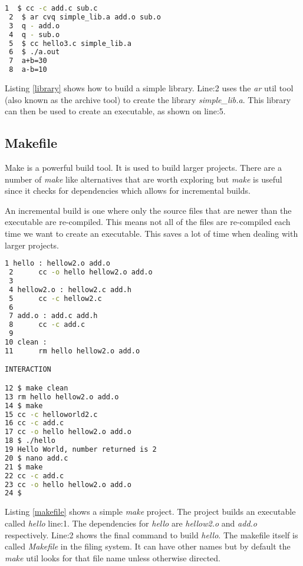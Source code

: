 \begin{lstlisting}[language=bash,showstringspaces=false,caption={File hellow3.c, build library},captionpos=b,label=library]
 1  $ cc -c add.c sub.c
 2  $ ar cvq simple_lib.a add.o sub.o
 3  q - add.o
 4  q - sub.o
 5  $ cc hello3.c simple_lib.a
 6  $ ./a.out
 7  a+b=30
 8  a-b=10 	
\end{lstlisting}

Listing \ref{library} shows how to build a simple library. Line:2 uses the \textit{ar} util tool (also known as the archive tool) to create the library \textit{simple\_lib.a}. This library can then be used to create an executable, as shown on line:5. 

\subsection{Makefile}


Make is a powerful build tool. It is used to build larger projects. There are a number of \textit{make} like alternatives that are worth exploring but \textit{make} is useful since it checks for dependencies which allows for incremental builds.

An incremental build is one where only the source files that are newer than the executable are re-compiled. This means not all of the files are re-compiled each time we want to create an executable. This saves a lot of time when dealing with larger projects.\\

\begin{lstlisting}[language=bash,showstringspaces=false,caption={File Makefile, build a program called hello},captionpos=b,label=makefile]
 1 hello : hellow2.o add.o 
 2 		cc -o hello hellow2.o add.o
 3
 4 hellow2.o : hellow2.c add.h
 5  	cc -c hellow2.c
 6 
 7 add.o : add.c add.h 
 8 		cc -c add.c
 9
10 clean :
11 		rm hello hellow2.o add.o

INTERACTION

12 $ make clean
13 rm hello hellow2.o add.o
14 $ make
15 cc -c helloworld2.c
16 cc -c add.c
17 cc -o hello hellow2.o add.o
18 $ ./hello
19 Hello World, number returned is 2
20 $ nano add.c  
21 $ make
22 cc -c add.c
23 cc -o hello hellow2.o add.o
24 $ 
\end{lstlisting}
   
Listing \ref{makefile} shows a simple \textit{make} project. The project builds an executable called \textit{hello} line:1. The dependencies for \textit{hello} are \textit{hellow2.o} and \textit{add.o} respectively. Line:2 shows the final command to build \textit{hello}. The makefile itself is called \textit{Makefile} in the filing system. It can have other names but by default the \textit{make} util looks for that file name unless otherwise directed.

